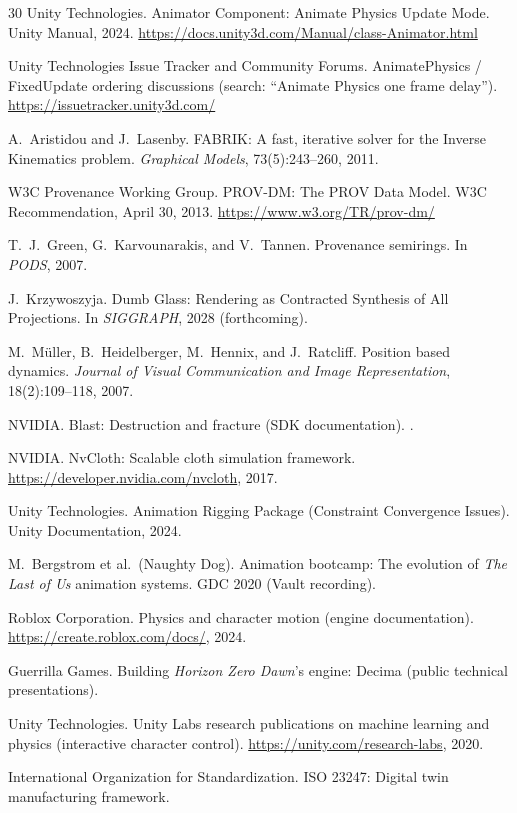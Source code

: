 \documentclass[sigconf,nonacm]{acmart}
\begin{document}
\begin{thebibliography}{30}
Unity Technologies.
\newblock Animator Component: Animate Physics Update Mode.
\newblock Unity Manual, 2024.
\newblock \url{https://docs.unity3d.com/Manual/class-Animator.html}

Unity Technologies Issue Tracker and Community Forums.
\newblock AnimatePhysics / FixedUpdate ordering discussions (search:
  ``Animate Physics one frame delay'').
\newblock \url{https://issuetracker.unity3d.com/}

A.~Aristidou and J.~Lasenby.
\newblock FABRIK: A fast, iterative solver for the Inverse Kinematics problem.
\newblock \emph{Graphical Models}, 73(5):243--260, 2011.

W3C Provenance Working Group.
\newblock PROV-DM: The PROV Data Model.
\newblock W3C Recommendation, April 30, 2013.
\newblock \url{https://www.w3.org/TR/prov-dm/}

T.~J.~Green, G.~Karvounarakis, and V.~Tannen.
\newblock Provenance semirings.
\newblock In \emph{PODS}, 2007.

J.~Krzywoszyja.
\newblock Dumb Glass: Rendering as Contracted Synthesis of All Projections.
\newblock In \emph{SIGGRAPH}, 2028 (forthcoming).

M.~M\"uller, B.~Heidelberger, M.~Hennix, and J.~Ratcliff.
\newblock Position based dynamics.
\newblock \emph{Journal of Visual Communication and Image
  Representation}, 18(2):109--118, 2007.

NVIDIA.
\newblock Blast: Destruction and fracture (SDK documentation).
.

NVIDIA.
\newblock NvCloth: Scalable cloth simulation framework.
\newblock \url{https://developer.nvidia.com/nvcloth}, 2017.

Unity Technologies.
\newblock Animation Rigging Package (Constraint Convergence Issues).
\newblock Unity Documentation, 2024.

M.~Bergstrom et al.\ (Naughty Dog).
\newblock Animation bootcamp: The evolution of \emph{The Last of Us}
  animation systems.
\newblock GDC 2020 (Vault recording).

Roblox Corporation.
\newblock Physics and character motion (engine documentation).
\newblock \url{https://create.roblox.com/docs/}, 2024.

Guerrilla Games.
\newblock Building \emph{Horizon Zero Dawn}'s engine: Decima (public
  technical presentations).

Unity Technologies.
\newblock Unity Labs research publications on machine learning and
  physics (interactive character control).
\newblock \url{https://unity.com/research-labs}, 2020.

International Organization for Standardization.
\newblock ISO 23247: Digital twin manufacturing framework.

\end{thebibliography}
\fi
\end{document}
